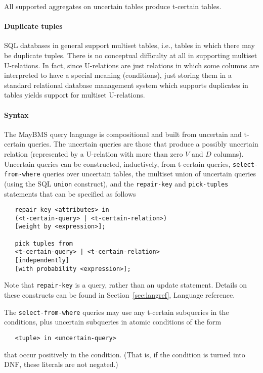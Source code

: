 All supported aggregates on uncertain tables produce t-certain tables.

\paragraph{Duplicate tuples}
SQL databases in general support multiset tables, i.e., tables in which there may be duplicate tuples.  There is no conceptual difficulty at all in supporting multiset U-relations.  In fact, since U-relations are just relations in which some columns are interpreted to have a special meaning (conditions), just storing them in a standard relational database management system which supports duplicates in tables yields support for multiset U-relations.

\paragraph{Syntax}
The MayBMS query language is compositional and built from uncertain and t-certain queries. 
The uncertain queries are those that produce a possibly uncertain relation (represented by a U-relation with more than zero $V$ and $D$ columns). Uncertain queries can be constructed, inductively, from t-certain queries, {\tt select-from-where} queries over uncertain tables, the multiset union of uncertain queries (using the SQL {\tt union} construct), and the {\tt repair-key} and {\tt pick-tuples} statements that can be specified as follows
\begin{verbatim}
   repair key <attributes> in 
   (<t-certain-query> | <t-certain-relation>)
   [weight by <expression>];
   
   pick tuples from
   <t-certain-query> | <t-certain-relation>
   [independently] 
   [with probability <expression>];
\end{verbatim}
Note that {\tt repair-key} is a query, rather than an update statement.
Details on these constructs can be found in Section~\ref{sec:langref}, Language reference.

The {\tt select-from-where} queries may use any t-certain subqueries in the conditions, plus uncertain subqueries in atomic conditions of the form
\begin{verbatim}
   <tuple> in <uncertain-query>
\end{verbatim}
that occur positively in the condition. (That is, if the condition is turned into DNF, these literals are not negated.)


